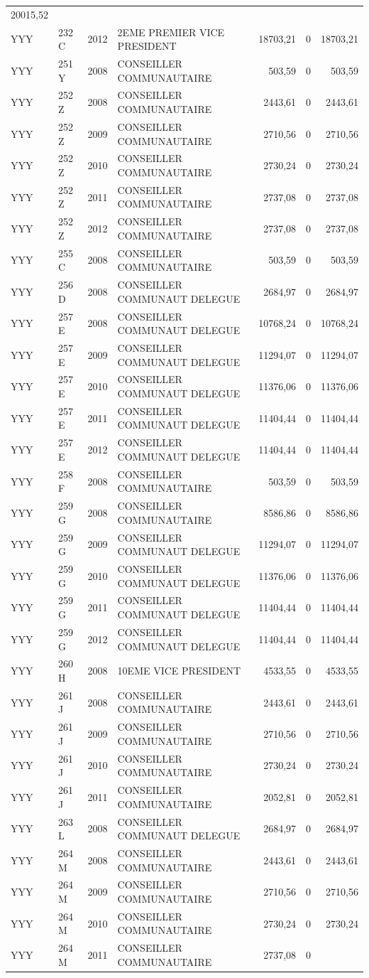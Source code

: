 \begin{longtable}[]{@{}llrlrrr@{}}
20015,52\tabularnewline
YYY & 232 C & 2012 & 2EME PREMIER VICE PRESIDENT & 18703,21 & 0 &
18703,21\tabularnewline
YYY & 251 Y & 2008 & CONSEILLER COMMUNAUTAIRE & 503,59 & 0 &
503,59\tabularnewline
YYY & 252 Z & 2008 & CONSEILLER COMMUNAUTAIRE & 2443,61 & 0 &
2443,61\tabularnewline
YYY & 252 Z & 2009 & CONSEILLER COMMUNAUTAIRE & 2710,56 & 0 &
2710,56\tabularnewline
YYY & 252 Z & 2010 & CONSEILLER COMMUNAUTAIRE & 2730,24 & 0 &
2730,24\tabularnewline
YYY & 252 Z & 2011 & CONSEILLER COMMUNAUTAIRE & 2737,08 & 0 &
2737,08\tabularnewline
YYY & 252 Z & 2012 & CONSEILLER COMMUNAUTAIRE & 2737,08 & 0 &
2737,08\tabularnewline
YYY & 255 C & 2008 & CONSEILLER COMMUNAUTAIRE & 503,59 & 0 &
503,59\tabularnewline
YYY & 256 D & 2008 & CONSEILLER COMMUNAUT DELEGUE & 2684,97 & 0 &
2684,97\tabularnewline
YYY & 257 E & 2008 & CONSEILLER COMMUNAUT DELEGUE & 10768,24 & 0 &
10768,24\tabularnewline
YYY & 257 E & 2009 & CONSEILLER COMMUNAUT DELEGUE & 11294,07 & 0 &
11294,07\tabularnewline
YYY & 257 E & 2010 & CONSEILLER COMMUNAUT DELEGUE & 11376,06 & 0 &
11376,06\tabularnewline
YYY & 257 E & 2011 & CONSEILLER COMMUNAUT DELEGUE & 11404,44 & 0 &
11404,44\tabularnewline
YYY & 257 E & 2012 & CONSEILLER COMMUNAUT DELEGUE & 11404,44 & 0 &
11404,44\tabularnewline
YYY & 258 F & 2008 & CONSEILLER COMMUNAUTAIRE & 503,59 & 0 &
503,59\tabularnewline
YYY & 259 G & 2008 & CONSEILLER COMMUNAUTAIRE & 8586,86 & 0 &
8586,86\tabularnewline
YYY & 259 G & 2009 & CONSEILLER COMMUNAUT DELEGUE & 11294,07 & 0 &
11294,07\tabularnewline
YYY & 259 G & 2010 & CONSEILLER COMMUNAUT DELEGUE & 11376,06 & 0 &
11376,06\tabularnewline
YYY & 259 G & 2011 & CONSEILLER COMMUNAUT DELEGUE & 11404,44 & 0 &
11404,44\tabularnewline
YYY & 259 G & 2012 & CONSEILLER COMMUNAUT DELEGUE & 11404,44 & 0 &
11404,44\tabularnewline
YYY & 260 H & 2008 & 10EME VICE PRESIDENT & 4533,55 & 0 &
4533,55\tabularnewline
YYY & 261 J & 2008 & CONSEILLER COMMUNAUTAIRE & 2443,61 & 0 &
2443,61\tabularnewline
YYY & 261 J & 2009 & CONSEILLER COMMUNAUTAIRE & 2710,56 & 0 &
2710,56\tabularnewline
YYY & 261 J & 2010 & CONSEILLER COMMUNAUTAIRE & 2730,24 & 0 &
2730,24\tabularnewline
YYY & 261 J & 2011 & CONSEILLER COMMUNAUTAIRE & 2052,81 & 0 &
2052,81\tabularnewline
YYY & 263 L & 2008 & CONSEILLER COMMUNAUT DELEGUE & 2684,97 & 0 &
2684,97\tabularnewline
YYY & 264 M & 2008 & CONSEILLER COMMUNAUTAIRE & 2443,61 & 0 &
2443,61\tabularnewline
YYY & 264 M & 2009 & CONSEILLER COMMUNAUTAIRE & 2710,56 & 0 &
2710,56\tabularnewline
YYY & 264 M & 2010 & CONSEILLER COMMUNAUTAIRE & 2730,24 & 0 &
2730,24\tabularnewline
YYY & 264 M & 2011 & CONSEILLER COMMUNAUTAIRE & 2737,08 & 0 &

\end{longtable}
